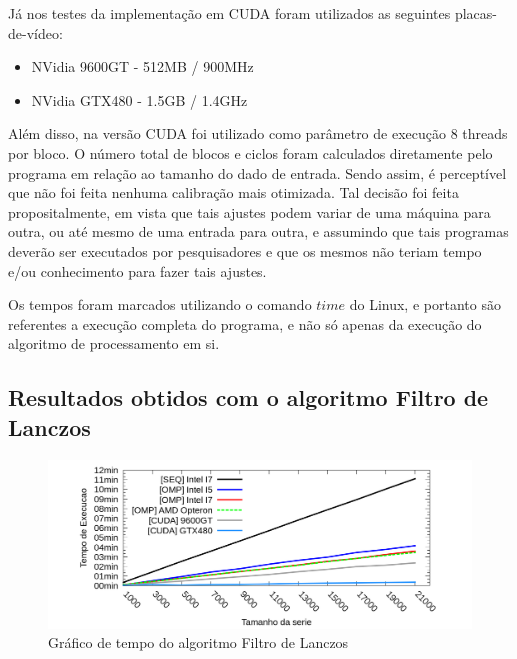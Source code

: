Já nos testes da implementação em CUDA foram utilizados as seguintes placas-de-vídeo:

\begin{itemize}
\item NVidia	 9600GT - 512MB / 900MHz
\item NVidia GTX480 - 1.5GB / 1.4GHz
\end{itemize}

Além disso, na versão CUDA foi utilizado como parâmetro de execução 8 threads por bloco. O número total de blocos e ciclos foram calculados diretamente pelo programa em relação ao tamanho do dado de entrada. Sendo assim, é perceptível que não foi feita nenhuma calibração mais otimizada. Tal decisão foi feita propositalmente, em vista que tais ajustes podem variar de uma máquina para outra, ou até mesmo de uma entrada para outra, e assumindo que tais programas deverão ser executados por pesquisadores e que os mesmos não teriam tempo e/ou conhecimento para fazer tais ajustes.

Os tempos foram marcados utilizando o comando $time$ do Linux, e portanto são referentes a execução completa do programa, e não só apenas da execução do algoritmo de processamento em si.

\subsection{Resultados obtidos com o algoritmo Filtro de Lanczos}

\begin{figure}[H]
\centering
\includegraphics[width=1.0\textwidth]{Imagens/graficos_lanczos/lanczos_tempos.png}
\caption{Gráfico de tempo do algoritmo Filtro de Lanczos}
\label{fig:grafico_tempo_lanczos}
\end{figure}

